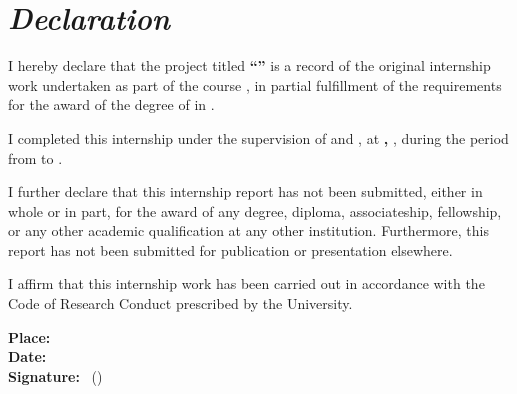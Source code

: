 \chapter*{\textbf{\textit{Declaration}}}

\begingroup
\setlength{\parskip}{0.7cm}
\setlength{\parindent}{0pt}

I hereby declare that the project titled \textbf{``\InternshipTitle''} is a record of the original internship work undertaken as part of the course \textbf{\CourseCodeName}, in partial fulfillment of the requirements for the award of the degree of \textbf{\DegreeName} in \textbf{\SpecializationName}.

I completed this internship under the supervision of \textbf{\GuideName} and \textbf{\IndustryGuideName}, at \textbf{\CompanyName, \CompanyAddress}, during the period from \textbf{\InternshipStartDate} to \textbf{\InternshipEndDate}.

I further declare that this internship report has not been submitted, either in whole or in part, for the award of any degree, diploma, associateship, fellowship, or any other academic qualification at any other institution. Furthermore, this report has not been submitted for publication or presentation elsewhere.

I affirm that this internship work has been carried out in accordance with the Code of Research Conduct prescribed by the University.


\vspace{1.0cm}
\textbf{Place:} \CampusAddress \\
\textbf{Date:} \DeclarationDate \\[1.2cm]
\textbf{Signature:} \StudentName\ (\StudentRegNo)

\endgroup
